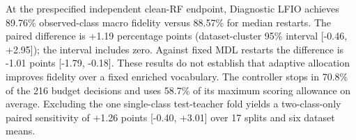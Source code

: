 At the prespecified independent clean-RF endpoint, Diagnostic LFIO achieves 89.76\% observed-class macro fidelity versus 88.57\% for median restarts. The paired difference is +1.19 percentage points (dataset-cluster 95\% interval [-0.46, +2.95]); the interval includes zero. Against fixed MDL restarts the difference is -1.01 points [-1.79, -0.18]. These results do not establish that adaptive allocation improves fidelity over a fixed enriched vocabulary. The controller stops in 70.8\% of the 216 budget decisions and uses 58.7\% of its maximum scoring allowance on average. Excluding the one single-class test-teacher fold yields a two-class-only paired sensitivity of +1.26 points [-0.40, +3.01] over 17 splits and six dataset means.
